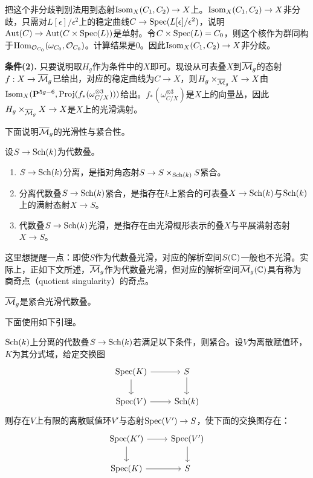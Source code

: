 把这个非分歧判别法用到态射$\operatorname{Isom}_X(C_1,C_2)\to X$上。$\operatorname{Isom}_X(C_1,C_2)\to X$非分歧，只需对$L[\epsilon]/\epsilon^2$上的稳定曲线$C\to\operatorname{Spec}(L[\epsilon]/\epsilon^2)$，说明$\operatorname{Aut}(C)\to\operatorname{Aut}(C\times\operatorname{Spec}(L))$是单射。令$C\times\operatorname{Spec}(L)=C_0$，则这个核作为群同构于$\operatorname{Hom}_{\mathcal{O}_{C_0}}(\omega_{C_0},\mathcal{O}_{C_0})$。计算结果是$0$。因此$\operatorname{Isom}_X(C_1,C_2)\to X$非分歧。

\noindent\textbf{条件(2).}
只要说明取$H_g$作为条件中的$X$即可。现设从可表叠$X$到$\overline{\mathcal{M}}_{g}$的态射$f:X\to\overline{\mathcal{M}}_{g}$已给出，对应的稳定曲线为$C\to X$，则$H_g\times_{\overline{\mathcal{M}}_{g}}X\to X$由$\operatorname{Isom}_X(\mathbf{P}^{5g-6},\operatorname{Proj}(f_*(\omega_{C/X}^{\otimes3})))$给出。$f_*(\omega_{C/X}^{\otimes3})$是$X$上的向量丛，因此$H_g\times_{\overline{\mathcal{M}}_{g}}X\to X$是$X$上的光滑满射。

下面说明$\overline{\mathcal{M}}_{g}$的光滑性与紧合性。

\begin{definition}
设$S\to\operatorname{Sch}(k)$为代数叠。
\begin{enumerate}[label=(\arabic*)]
\item $S\to\operatorname{Sch}(k)$分离，是指对角态射$S\to S\times_{\operatorname{Sch}(k)}S$紧合。
\item 分离代数叠$S\to\operatorname{Sch}(k)$紧合，是指存在$k$上紧合的可表叠$X\to\operatorname{Sch}(k)$与$\operatorname{Sch}(k)$上的满射态射$X\to S$。
\item 代数叠$S\to\operatorname{Sch}(k)$光滑，是指存在由光滑概形表示的叠$X$与平展满射态射$X\to S$。
\end{enumerate}
\end{definition}


这里想提醒一点：即使$S$作为代数叠光滑，对应的解析空间$S(\mathbb{C})$一般也不光滑。实际上，正如下文所述，$\overline{\mathcal{M}}_{g}$作为代数叠光滑，但对应的解析空间$\overline{\mathcal{M}}_{g}(\mathbb{C})$具有称为商奇点（quotient singularity）的奇点。

\begin{theorem}
$\overline{\mathcal{M}}_{g}$是紧合光滑代数叠。
\end{theorem}

下面使用如下引理。

\begin{lemma}
$\operatorname{Sch}(k)$上分离的代数叠$S\to\operatorname{Sch}(k)$若满足以下条件，则紧合。设$V$为离散赋值环，$K$为其分式域，给定交换图
\[
\begin{tikzcd}
\Spec(K) \arrow[r] \arrow[d] & S \arrow[d] \\
\Spec(V) \arrow[r] & \Sch(k)
\end{tikzcd}
\]
则存在$V$上有限的离散赋值环$V'$与态射$\operatorname{Spec}(V')\to S$，使下面的交换图存在：
\[
\begin{tikzcd}
\Spec(K') \arrow[r] \arrow[d] & \Spec(V') \arrow[d] \\
\Spec(K) \arrow[r] & S
\end{tikzcd}
\]
\end{lemma}

